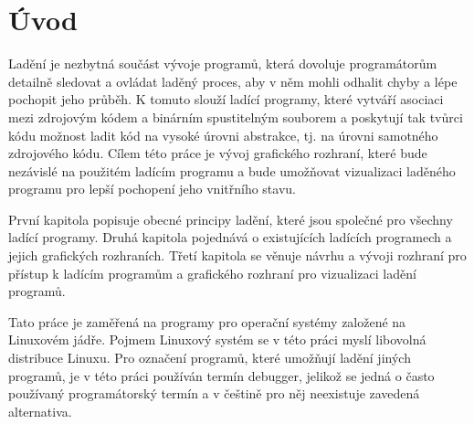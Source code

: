 \documentclass[bc,male,python,dept460]{diploma}						%
\begin{document}
\MakeTitlePages

\tableofcontents
\cleardoublepage	%

\listoftables
\cleardoublepage	%

\listoffigures
\cleardoublepage	%

\lstlistoflistings
\cleardoublepage	%

\section{Úvod}
	Ladění je nezbytná součást vývoje programů, která dovoluje programátorům detailně sledovat a ovládat laděný proces, aby v něm mohli odhalit
	chyby a lépe pochopit jeho průběh. K tomuto slouží ladící programy, které vytváří asociaci mezi zdrojovým kódem a binárním spustitelným
	souborem a poskytují tak tvůrci kódu možnost ladit kód na vysoké úrovni abstrakce, tj. na úrovni samotného zdrojového kódu. Cílem této práce
	je vývoj grafického rozhraní, které bude nezávislé na použitém ladícím programu a bude umožňovat vizualizaci laděného programu pro lepší
	pochopení jeho vnitřního stavu.
	
	\par První kapitola popisuje obecné principy ladění, které jsou společné pro všechny ladící programy. Druhá kapitola pojednává o existujících
	ladících programech a jejich grafických rozhraních. Třetí kapitola se věnuje návrhu a vývoji rozhraní pro přístup k ladícím programům a grafického
	rozhraní pro vizualizaci ladění programů.
	
	\par Tato práce je zaměřená na programy pro operační systémy založené na Linuxovém jádře. Pojmem Linuxový systém se v této práci myslí
	libovolná distribuce Linuxu. Pro označení programů, které umožňují ladění jiných programů, je v této práci používán termín debugger,
	jelikož se jedná o často používaný programátorský termín a v češtině pro něj neexistuje zavedená alternativa.
	
\end{document}
